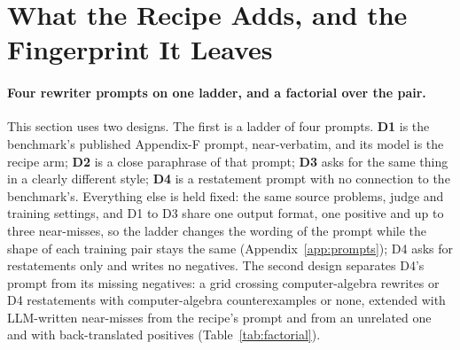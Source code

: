 
\section{What the Recipe Adds, and the Fingerprint It Leaves}
\label{sec:mechanism}

\paragraph{Four rewriter prompts on one ladder, and a factorial over the pair.}
This section uses two designs. The first is a ladder of four prompts. \textbf{D1} is the benchmark's published Appendix-F prompt, near-verbatim, and its model is the recipe arm; \textbf{D2} is a close paraphrase of that prompt; \textbf{D3} asks for the same thing in a clearly different style; \textbf{D4} is a restatement prompt with no connection to the benchmark's. Everything else is held fixed: the same source problems, judge and training settings, and D1 to D3 share one output format, one positive and up to three near-misses, so the ladder changes the wording of the prompt while the shape of each training pair stays the same (Appendix~\ref{app:prompts}); D4 asks for restatements only and writes no negatives. The second design separates D4's prompt from its missing negatives: a grid crossing computer-algebra rewrites or D4 restatements with computer-algebra counterexamples or none, extended with LLM-written near-misses from the recipe's prompt and from an unrelated one and with back-translated positives (Table~\ref{tab:factorial}).


